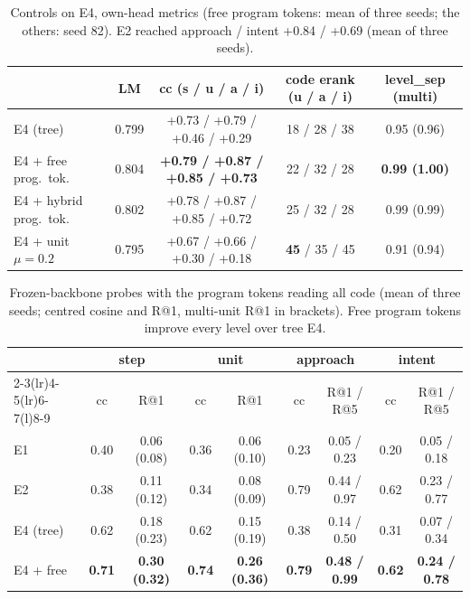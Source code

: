 \documentclass[11pt]{article}
\begin{document}
\begin{table}[h]
\centering
\small
\setlength{\tabcolsep}{2pt}
\caption{Controls on E4, own-head metrics (free program tokens: mean of three seeds; the others: seed 82).
E2 reached approach / intent +0.84 / +0.69 (mean of three seeds).}
\label{tab:controls}
\begin{tabular}{@{}l c c c c@{}}
\toprule
& LM & cc (s / u / a / i) & code erank (u / a / i) & level\_sep (multi) \\
\midrule
E4 (tree) & 0.799 & +0.73 / +0.79 / +0.46 / +0.29 & 18 / 28 / 38 & 0.95 (0.96) \\
E4 + free prog.\ tok. & 0.804 & \textbf{+0.79 / +0.87 / +0.85 / +0.73} & 22 / 32 / 28 & \textbf{0.99 (1.00)} \\
E4 + hybrid prog.\ tok. & 0.802 & +0.78 / +0.87 / +0.85 / +0.72 & 25 / 32 / 28 & 0.99 (0.99) \\
E4 + unit $\mu=0.2$ & 0.795 & +0.67 / +0.66 / +0.30 / +0.18 & \textbf{45} / 35 / 45 & 0.91 (0.94) \\
\bottomrule
\end{tabular}
\end{table}

\begin{table}[h]
\centering
\small
\setlength{\tabcolsep}{3pt}
\caption{Frozen-backbone probes with the program tokens reading all code (mean of three seeds; centred cosine and
R@1, multi-unit R@1 in brackets). Free program tokens improve every level over tree E4.}
\label{tab:probes-free}
\begin{tabular}{@{}l cc cc cc cc@{}}
\toprule
& \multicolumn{2}{c}{step} & \multicolumn{2}{c}{unit} & \multicolumn{2}{c}{approach} & \multicolumn{2}{c}{intent} \\
\cmidrule(lr){2-3}\cmidrule(lr){4-5}\cmidrule(lr){6-7}\cmidrule(l){8-9}
& cc & R@1 & cc & R@1 & cc & R@1 / R@5 & cc & R@1 / R@5 \\
\midrule
E1 & 0.40 & 0.06 (0.08) & 0.36 & 0.06 (0.10) & 0.23 & 0.05 / 0.23 & 0.20 & 0.05 / 0.18 \\
E2 & 0.38 & 0.11 (0.12) & 0.34 & 0.08 (0.09) & 0.79 & 0.44 / 0.97 & 0.62 & 0.23 / 0.77 \\
E4 (tree) & 0.62 & 0.18 (0.23) & 0.62 & 0.15 (0.19) & 0.38 & 0.14 / 0.50 & 0.31 & 0.07 / 0.34 \\
E4 + free & \textbf{0.71} & \textbf{0.30 (0.32)} & \textbf{0.74} & \textbf{0.26 (0.36)} & \textbf{0.79} & \textbf{0.48 / 0.99} & \textbf{0.62} & \textbf{0.24 / 0.78} \\
\bottomrule
\end{tabular}
\end{table}
\end{document}
